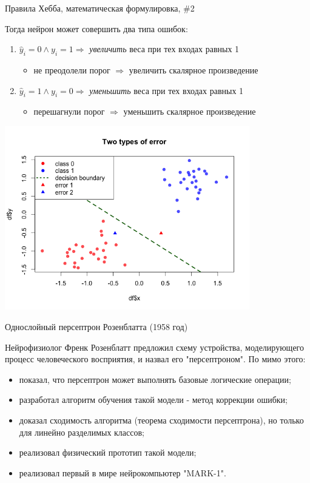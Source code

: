 \documentclass[10pt]{beamer}
\begin{document}
\begin{frame}{Правила Хебба, математическая формулировка, \#2}

Тогда нейрон может совершить два типа ошибок:
\begin{enumerate}
	\item $\hat y_i = 0 \wedge y_i = 1 \Rightarrow $ \textit{увеличить} веса при тех входах равных 1
	\begin{itemize}
		\item не преодолели порог $\Rightarrow$ увеличить скалярное произведение
	\end{itemize}
	\item $\hat y_i = 1 \wedge y_i = 0 \Rightarrow $ \textit{уменьшить} веса при тех входах равных 1
	\begin{itemize}
		\item перешагнули порог $\Rightarrow$ уменьшить скалярное произведение
	\end{itemize}
\end{enumerate}
\centering
\includegraphics[width=0.8\textwidth]{images/two_types_errors.png}

\end{frame}


\begin{frame}{Однослойный персептрон Розенблатта (1958 год)}

Нейрофизиолог Френк Розенблатт предложил схему устройства, моделирующего процесс человеческого восприятия, и назвал его "персептроном". По мимо этого:
\begin{itemize}
	\item показал, что персептрон может выполнять базовые логические операции;
	\item разработал алгоритм обучения такой модели - метод коррекции ошибки;
	\item доказал сходимость алгоритма (теорема сходимости персептрона), но только для линейно разделимых классов;
	\item реализовал физический прототип такой модели;
	\item реализовал первый в мире нейрокомпьютер "MARK-1".
\end{itemize}

\end{frame}
\end{document}
